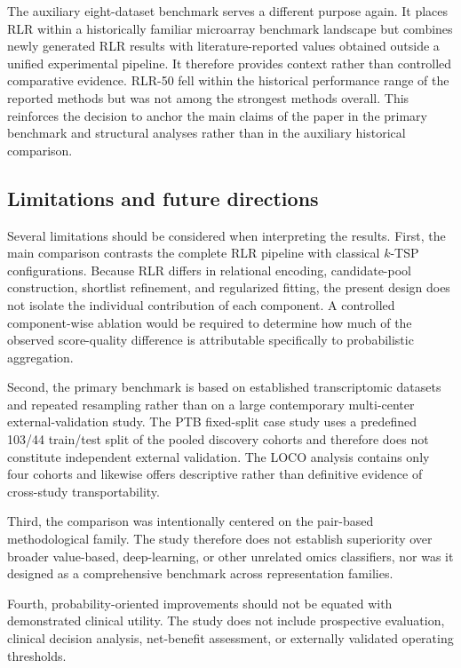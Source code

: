 \documentclass[journal]{IEEEtran}
\begin{document}
The auxiliary eight-dataset benchmark serves a different purpose again. It places RLR within a historically familiar microarray benchmark landscape but combines newly generated RLR results with literature-reported values obtained outside a unified experimental pipeline. It therefore provides context rather than controlled comparative evidence. RLR-50 fell within the historical performance range of the reported methods but was not among the strongest methods overall. This reinforces the decision to anchor the main claims of the paper in the primary benchmark and structural analyses rather than in the auxiliary historical comparison.

\subsection{Limitations and future directions}

Several limitations should be considered when interpreting the results. First, the main comparison contrasts the complete RLR pipeline with classical $k$-TSP configurations. Because RLR differs in relational encoding, candidate-pool construction, shortlist refinement, and regularized fitting, the present design does not isolate the individual contribution of each component. A controlled component-wise ablation would be required to determine how much of the observed score-quality difference is attributable specifically to probabilistic aggregation.

Second, the primary benchmark is based on established transcriptomic datasets and repeated resampling rather than on a large contemporary multi-center external-validation study. The PTB fixed-split case study uses a predefined 103/44 train/test split of the pooled discovery cohorts and therefore does not constitute independent external validation. The LOCO analysis contains only four cohorts and likewise offers descriptive rather than definitive evidence of cross-study transportability.

Third, the comparison was intentionally centered on the pair-based methodological family. The study therefore does not establish superiority over broader value-based, deep-learning, or other unrelated omics classifiers, nor was it designed as a comprehensive benchmark across representation families.

Fourth, probability-oriented improvements should not be equated with demonstrated clinical utility. The study does not include prospective evaluation, clinical decision analysis, net-benefit assessment, or externally validated operating thresholds.
\end{document}
